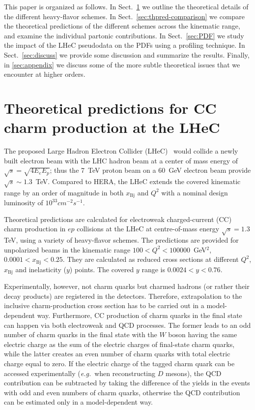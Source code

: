 \documentclass[pdftex,twocolumn,epjc3]{svjour3}          %
\newcommand{\xbj}{\ensuremath{x_{\text{Bj}}}\xspace}
\begin{document}
This paper is organized as follows.
%
In Sect.~\ref{sec:thpred} we outline the theoretical details of the
different heavy-flavor schemes.
%
In Sect.~\ref{sec:thpred-comparison} we compare the theoretical
predictions of the different schemes across the kinematic range, and
examine the individual partonic contributions.
%
In Sect.~\ref{sec:PDF} we study the impact of the LHeC pseudodata on
the PDFs using a profiling technique.
%
In Sect.~\ref{sec:discuss} we provide some discussion and summarize the
results.
%
Finally, in \ref{sec:appendix} we discuss some of the more subtle
theoretical issues that we encounter at higher orders.

\goodbreak
%
%
\section{Theoretical predictions for CC charm production at the LHeC} \label{sec:thpred}

The proposed Large Hadron Electron Collider
(LHeC)~\cite{AbelleiraFernandez:2012cc} would collide a newly built
electron beam with the LHC hadron beam at a center of mass energy of
$\sqrt{s} = \sqrt{4 E_e E_p}$; thus the 7~TeV proton beam on a 60~GeV
electron beam provide $\sqrt{s}\sim 1.3$~TeV.
%
Compared to HERA, the LHeC extends the covered kinematic range by an
order of magnitude in both \xbj and $Q^2$ with a nominal design
luminosity of $10^{33} cm^{-2} s^{-1}$.

%

Theoretical predictions are calculated for electroweak charged-current
(CC) charm production in $ep$ collisions at the LHeC at centre-of-mass
energy $\sqrt{s} = 1.3$ TeV, using a variety of heavy-flavor
schemes. The predictions are provided for unpolarized beams in the
kinematic range $100 < Q^2 < 100000$~GeV$^2$, $0.0001 < \xbj < 0.25$.
They are calculated as reduced cross sections at different $Q^2$, \xbj
and inelasticity ($y$) points. 
The covered $y$ range is $0.0024 < y < 0.76$.

Experimentally, however, not charm quarks but charmed hadrons (or
rather their decay products) are registered in the detectors.
Therefore, extrapolation to the inclusive charm-production cross
section has to be carried out in a model-dependent way. Furthermore,
CC production of charm quarks in the final state can happen via both
electroweak and QCD processes.  The former leads to an odd number of
charm quarks in the final state with the $W$ boson having the same
electric charge as the sum of the electric charges of final-state
charm quarks, while the latter creates an even number of charm quarks
with total electric charge equal to zero. If the electric charge of
the tagged charm quark can be accessed experimentally
(\textit{e.g.}~when reconstructing $D$ mesons), the QCD contribution
can be subtracted by taking the difference of the yields in the events
with odd and even numbers of charm quarks, otherwise the QCD
contribution can be estimated only in a model-dependent way.
\end{document}
